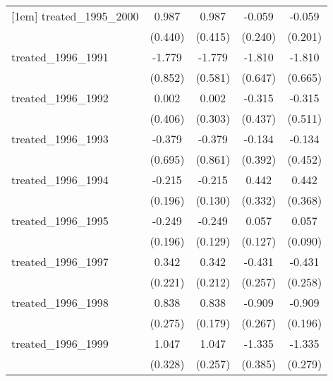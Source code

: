 {\begin{tabular}{l*{4}{c}}
[1em]
treated\_1995\_2000&       0.987\sym{*}  &       0.987\sym{*}  &      -0.059         &      -0.059         \\
            &     (0.440)         &     (0.415)         &     (0.240)         &     (0.201)         \\
[1em]
treated\_1996\_1991&      -1.779\sym{*}  &      -1.779\sym{**} &      -1.810\sym{**} &      -1.810\sym{**} \\
            &     (0.852)         &     (0.581)         &     (0.647)         &     (0.665)         \\
[1em]
treated\_1996\_1992&       0.002         &       0.002         &      -0.315         &      -0.315         \\
            &     (0.406)         &     (0.303)         &     (0.437)         &     (0.511)         \\
[1em]
treated\_1996\_1993&      -0.379         &      -0.379         &      -0.134         &      -0.134         \\
            &     (0.695)         &     (0.861)         &     (0.392)         &     (0.452)         \\
[1em]
treated\_1996\_1994&      -0.215         &      -0.215         &       0.442         &       0.442         \\
            &     (0.196)         &     (0.130)         &     (0.332)         &     (0.368)         \\
[1em]
treated\_1996\_1995&      -0.249         &      -0.249         &       0.057         &       0.057         \\
            &     (0.196)         &     (0.129)         &     (0.127)         &     (0.090)         \\
[1em]
treated\_1996\_1997&       0.342         &       0.342         &      -0.431         &      -0.431         \\
            &     (0.221)         &     (0.212)         &     (0.257)         &     (0.258)         \\
[1em]
treated\_1996\_1998&       0.838\sym{**} &       0.838\sym{***}&      -0.909\sym{***}&      -0.909\sym{***}\\
            &     (0.275)         &     (0.179)         &     (0.267)         &     (0.196)         \\
[1em]
treated\_1996\_1999&       1.047\sym{**} &       1.047\sym{***}&      -1.335\sym{***}&      -1.335\sym{***}\\
            &     (0.328)         &     (0.257)         &     (0.385)         &     (0.279)         \\

\end{tabular}}
